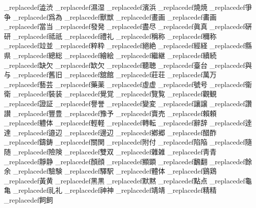 \brl@document_replacedef{澁}{渋}
\brl@document_replacedef{濕}{湿}
\brl@document_replacedef{濱}{浜}
\brl@document_replacedef{燒}{焼}
\brl@document_replacedef{爭}{争}
\brl@document_replacedef{爲}{為}
\brl@document_replacedef{獸}{獣}
\brl@document_replacedef{畫}{画}
\brl@document_replacedef{畵}{画}
\brl@document_replacedef{當}{当}
\brl@document_replacedef{發}{発}
\brl@document_replacedef{盡}{尽}
\brl@document_replacedef{眞}{真}
\brl@document_replacedef{硏}{研}
\brl@document_replacedef{祗}{祇}
\brl@document_replacedef{禮}{礼}
\brl@document_replacedef{稱}{称}
\brl@document_replacedef{穪}{称}
\brl@document_replacedef{竝}{並}
\brl@document_replacedef{粹}{粋}
\brl@document_replacedef{絕}{絶}
\brl@document_replacedef{經}{経}
\brl@document_replacedef{縣}{県}
\brl@document_replacedef{總}{総}
\brl@document_replacedef{繪}{絵}
\brl@document_replacedef{繼}{継}
\brl@document_replacedef{續}{続}
\brl@document_replacedef{缺}{欠}
\brl@document_replacedef{缼}{欠}
\brl@document_replacedef{聽}{聴}
\brl@document_replacedef{臺}{台}
\brl@document_replacedef{與}{与}
\brl@document_replacedef{舊}{旧}
\brl@document_replacedef{舘}{館}
\brl@document_replacedef{莊}{荘}
\brl@document_replacedef{萬}{万}
\brl@document_replacedef{藝}{芸}
\brl@document_replacedef{藥}{薬}
\brl@document_replacedef{虛}{虚}
\brl@document_replacedef{號}{号}
\brl@document_replacedef{衞}{衛}
\brl@document_replacedef{裝}{装}
\brl@document_replacedef{覺}{覚}
\brl@document_replacedef{覽}{覧}
\brl@document_replacedef{觀}{観}
\brl@document_replacedef{證}{証}
\brl@document_replacedef{譽}{誉}
\brl@document_replacedef{變}{変}
\brl@document_replacedef{讓}{譲}
\brl@document_replacedef{讚}{讃}
\brl@document_replacedef{豐}{豊}
\brl@document_replacedef{豫}{予}
\brl@document_replacedef{賣}{売}
\brl@document_replacedef{賴}{頼}
\brl@document_replacedef{軆}{体}
\brl@document_replacedef{輕}{軽}
\brl@document_replacedef{轉}{転}
\brl@document_replacedef{辭}{辞}
\brl@document_replacedef{逹}{達}
\brl@document_replacedef{邉}{辺}
\brl@document_replacedef{邊}{辺}
\brl@document_replacedef{鄕}{郷}
\brl@document_replacedef{醋}{酢}
\brl@document_replacedef{鑄}{鋳}
\brl@document_replacedef{關}{関}
\brl@document_replacedef{附}{付}
\brl@document_replacedef{陷}{陥}
\brl@document_replacedef{隨}{随}
\brl@document_replacedef{險}{険}
\brl@document_replacedef{雙}{双}
\brl@document_replacedef{雜}{雑}
\brl@document_replacedef{靑}{青}
\brl@document_replacedef{靜}{静}
\brl@document_replacedef{顏}{顔}
\brl@document_replacedef{顯}{顕}
\brl@document_replacedef{飜}{翻}
\brl@document_replacedef{餘}{余}
\brl@document_replacedef{驗}{験}
\brl@document_replacedef{驛}{駅}
\brl@document_replacedef{體}{体}
\brl@document_replacedef{鷄}{鶏}
\brl@document_replacedef{黃}{黄}
\brl@document_replacedef{黑}{黒}
\brl@document_replacedef{默}{黙}
\brl@document_replacedef{點}{点}
\brl@document_replacedef{龜}{亀}
\brl@document_replacedef{礼}{礼}
\brl@document_replacedef{神}{神}
\brl@document_replacedef{靖}{靖}
\brl@document_replacedef{精}{精}
\brl@document_replacedef{飼}{飼}
